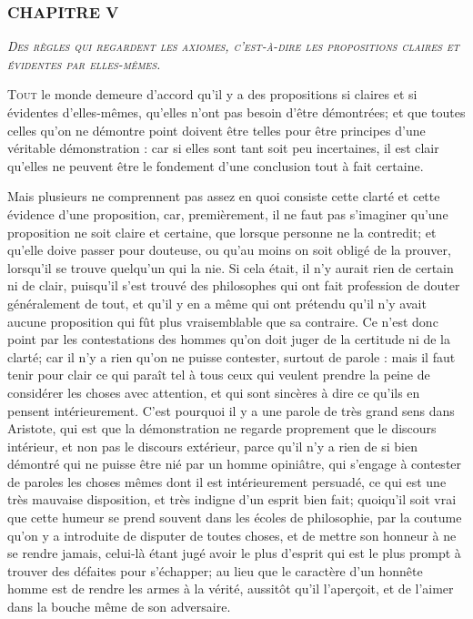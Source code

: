 \subsubsection{\centering \Large CHAPITRE V}
\begin{center}\emph{\large\scshape Des règles qui regardent les axiomes, c'est-à-dire les propositions claires et évidentes par elles-mêmes.}\end{center}


	\lettrine{T}{out} le monde demeure d'accord qu'il y a des propositions si claires et si évidentes d'elles-mêmes, qu'elles n'ont pas besoin d'être démontrées; et que toutes celles qu'on ne démontre point doivent être telles pour être principes d'une véritable démonstration : car si elles sont tant soit peu incertaines, il est clair qu'elles ne peuvent être le fondement d'une conclusion tout à fait certaine.

Mais plusieurs ne comprennent pas assez en quoi consiste cette clarté et cette évidence d'une proposition, car, premièrement, il ne faut pas s'imaginer qu'une proposition ne soit claire et certaine, que lorsque personne ne la contredit; et qu'elle doive passer pour douteuse, ou qu'au moins on soit obligé de la prouver, lorsqu'il se trouve quelqu'un qui la nie. Si cela était, il n'y aurait rien de certain ni de clair, puisqu'il s'est trouvé des philosophes qui ont fait profession de douter généralement de tout, et qu'il y en a même qui ont prétendu qu'il n'y avait aucune proposition qui fût plus vraisemblable que sa contraire. Ce n'est donc point par les contestations des hommes qu'on doit juger de la certitude ni de la clarté; car il n'y a rien qu'on ne puisse contester, surtout de parole : mais il faut tenir pour clair ce qui paraît tel à tous ceux qui veulent prendre la peine de considérer les choses avec attention, et qui sont sincères à dire ce qu'ils en pensent intérieurement. C'est pourquoi il y a une parole de très grand sens dans Aristote, qui est que la démonstration ne regarde proprement que le discours intérieur, et non pas le discours extérieur, parce qu'il n'y a rien de si bien démontré qui ne puisse être nié par un homme opiniâtre, qui s'engage à contester de paroles les choses mêmes dont il est intérieurement persuadé, ce qui est une très mauvaise disposition, et très indigne d'un esprit bien fait; quoiqu'il soit vrai que cette humeur se prend souvent dans les écoles de philosophie, par la coutume qu'on y a introduite de disputer de toutes choses, et de mettre son honneur à ne se rendre jamais, celui-là étant jugé avoir le plus d'esprit qui est le plus prompt à trouver des défaites pour s'échapper; au lieu que le caractère d'un honnête homme est de rendre les armes à la vérité, aussitôt qu'il l'aperçoit, et de l'aimer dans la bouche même de son adversaire.


